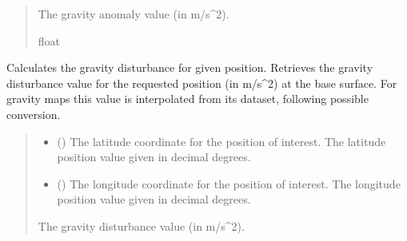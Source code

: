 \documentclass[letterpaper,10pt,english]{sphinxmanual}
\begin{document}
\begin{fulllineitems}
\begin{fulllineitems}
\begin{quote}
\begin{description}
\begin{itemize}
\end{itemize}

\sphinxAtStartPar
The gravity anomaly value (in m/s\textasciicircum{}2).

\sphinxAtStartPar
float

\end{description}\end{quote}

\end{fulllineitems}


\begin{fulllineitems}
\label{\detokenize{modules/gravity/ggm_plus:qnav.gravity.ggm_plus.GGMPlusAcc.get_disturbance}}
\pysigstartsignatures
{}
\pysigstopsignatures
\sphinxAtStartPar
Calculates the gravity disturbance for given position.
Retrieves the gravity disturbance value for the requested position
(in m/s\textasciicircum{}2) at the base surface. For gravity maps this value is
interpolated from its dataset, following possible conversion.
\begin{quote}\begin{description}
\begin{itemize}
\item {} 
\sphinxAtStartPar
{} () \textendash{} The latitude coordinate for the position of interest.
The latitude position value given in decimal degrees.

\item {} 
\sphinxAtStartPar
{} () \textendash{} The longitude coordinate for the position of interest.
The longitude position value given in decimal degrees.

\end{itemize}

\sphinxAtStartPar
The gravity disturbance value (in m/s\textasciicircum{}2).


\end{description}
\end{quote}
\end{fulllineitems}
\end{fulllineitems}
\end{document}
